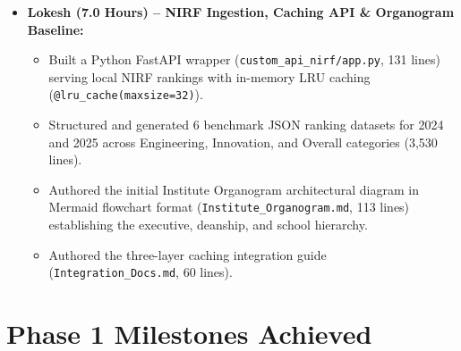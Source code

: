 \documentclass[11pt,a4paper]{article}
\begin{document}
\begin{itemize}[leftmargin=1.4em, itemsep=3pt]
\item \textbf{Lokesh (7.0 Hours) -- NIRF Ingestion, Caching API \& Organogram Baseline:}
  \begin{itemize}[leftmargin=1.2em, itemsep=1.5pt]
  \item Built a Python FastAPI wrapper (\texttt{custom\_api\_nirf/app.py}, 131 lines) serving local NIRF rankings with in-memory LRU caching (\texttt{@lru\_cache(maxsize=32)}).
  \item Structured and generated 6 benchmark JSON ranking datasets for 2024 and 2025 across Engineering, Innovation, and Overall categories (3,530 lines).
  \item Authored the initial Institute Organogram architectural diagram in Mermaid flowchart format (\texttt{Institute\_Organogram.md}, 113 lines) establishing the executive, deanship, and school hierarchy.
  \item Authored the three-layer caching integration guide (\texttt{Integration\_Docs.md}, 60 lines).
  \end{itemize}
\end{itemize}

\section{Phase 1 Milestones Achieved}
\end{document}
